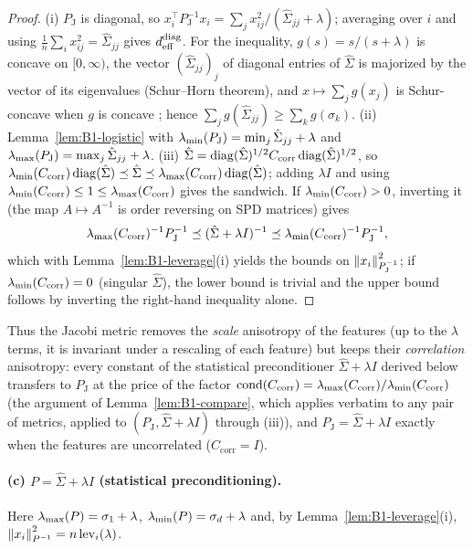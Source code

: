 \begin{proof}
(i) $P_{\mathrm J}$ is diagonal, so $x_i^\top P_{\mathrm J}^{-1}x_i=\sum_jx_{ij}^2/(\hat\Sigma_{jj}+\lambda)$; averaging over $i$ and
using $\frac1n\sum_ix_{ij}^2=\hat\Sigma_{jj}$ gives $d^{\operatorname{diag}}_{\mathrm{eff}}$. For the inequality,
$g(s)=s/(s+\lambda)$ is concave on $[0,\infty)$, the vector $(\hat\Sigma_{jj})_j$ of diagonal entries of
$\hat\Sigma$ is majorized by the vector of its eigenvalues (Schur--Horn theorem), and
$x\mapsto\sum_jg(x_j)$ is Schur-concave when $g$ is concave \cite{marshall2011inequalities}; hence
$\sum_jg(\hat\Sigma_{jj})\ge\sum_kg(\sigma_k)$.
(ii) Lemma~\ref{lem:B1-logistic} with $\lambda_{\min}(P_{\mathrm J})=\min_j\hat\Sigma_{jj}+\lambda$ and
$\lambda_{\max}(P_{\mathrm J})=\max_j\hat\Sigma_{jj}+\lambda$.
(iii) $\hat\Sigma=\operatorname{diag}(\hat\Sigma)^{1/2}C_{\mathrm{corr}}\operatorname{diag}(\hat\Sigma)^{1/2}$, so
$\lambda_{\min}(C_{\mathrm{corr}})\operatorname{diag}(\hat\Sigma)\preceq\hat\Sigma\preceq\lambda_{\max}(C_{\mathrm{corr}})\operatorname{diag}(\hat\Sigma)$; adding $\lambda I$ and
using $\lambda_{\min}(C_{\mathrm{corr}})\le1\le\lambda_{\max}(C_{\mathrm{corr}})$ gives the sandwich. If $\lambda_{\min}(C_{\mathrm{corr}})>0$,
inverting it (the map $A\mapsto A^{-1}$ is order reversing on SPD matrices) gives
\[
\lambda_{\max}(C_{\mathrm{corr}})^{-1}P_{\mathrm J}^{-1}\preceq(\hat\Sigma+\lambda I)^{-1}\preceq\lambda_{\min}(C_{\mathrm{corr}})^{-1}P_{\mathrm J}^{-1},
\]
which with Lemma~\ref{lem:B1-leverage}(i) yields the bounds on $\left\|x_i\right\|_{P_{\mathrm J}^{-1}}^2$; if
$\lambda_{\min}(C_{\mathrm{corr}})=0$ (singular $\hat\Sigma$), the lower bound is trivial and the upper bound follows by
inverting the right-hand inequality alone.
\end{proof}
Thus the Jacobi metric removes the \emph{scale} anisotropy of the features (up to the $\lambda$ terms, it
is invariant under a rescaling of each feature) but keeps their \emph{correlation} anisotropy: every
constant of the statistical preconditioner $\hat\Sigma+\lambda I$ derived below transfers to $P_{\mathrm J}$ at the
price of the factor $\operatorname{cond}(C_{\mathrm{corr}})=\lambda_{\max}(C_{\mathrm{corr}})/\lambda_{\min}(C_{\mathrm{corr}})$
(the argument of Lemma~\ref{lem:B1-compare}, which applies verbatim to any pair of metrics, applied to
$(P_{\mathrm J},\hat\Sigma+\lambda I)$ through (iii)), and $P_{\mathrm J}=\hat\Sigma+\lambda I$
exactly when the features are uncorrelated ($C_{\mathrm{corr}}=I$).

\paragraph{(c) $P=\hat\Sigma+\lambda I$ (statistical preconditioning).}
Here $\lambda_{\max}(P)=\sigma_1+\lambda$, $\lambda_{\min}(P)=\sigma_d+\lambda$ and, by Lemma~\ref{lem:B1-leverage}(i),
$\left\|x_i\right\|_{P^{-1}}^2=n\,\mathrm{lev}_i(\lambda)$.

